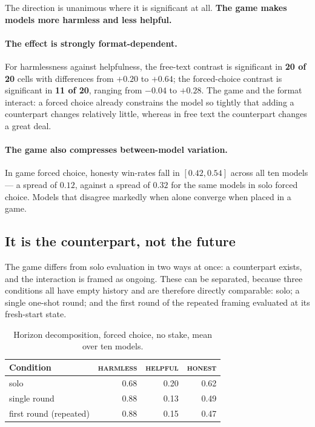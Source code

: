 \documentclass[11pt]{article}
\newcommand{\val}[1]{\textsc{#1}}
\begin{document}
The direction is unanimous where it is significant at all. \textbf{The game
makes models more harmless and less helpful.}

\paragraph{The effect is strongly format-dependent.}
For harmlessness against helpfulness, the free-text contrast is significant in
\textbf{20 of 20} cells with differences from $+0.20$ to $+0.64$; the
forced-choice contrast is significant in \textbf{11 of 20}, ranging from $-0.04$
to $+0.28$. The game and the format interact: a forced choice already
constrains the model so tightly that adding a counterpart changes relatively
little, whereas in free text the counterpart changes a great deal.

\paragraph{The game also compresses between-model variation.}
In game forced choice, honesty win-rates fall in $[0.42, 0.54]$ across all ten
models --- a spread of $0.12$, against a spread of $0.32$ for the same models in
solo forced choice. Models that disagree markedly when alone converge when
placed in a game.

\subsection{It is the counterpart, not the future}

The game differs from solo evaluation in two ways at once: a counterpart exists,
and the interaction is framed as ongoing. These can be separated, because three
conditions all have empty history and are therefore directly comparable: solo;
a single one-shot round; and the first round of the repeated framing evaluated
at its fresh-start state.

\begin{table}[h]\centering\small
\caption{Horizon decomposition, forced choice, no stake, mean over ten models.}
\label{tab:horizon}
\begin{tabular}{lrrr}
\toprule
Condition & \val{harmless} & \val{helpful} & \val{honest} \\
\midrule
solo & 0.68 & 0.20 & 0.62 \\
single round & 0.88 & 0.13 & 0.49 \\
first round (repeated) & 0.88 & 0.15 & 0.47 \\
\bottomrule
\end{tabular}
\end{table}
\end{document}
